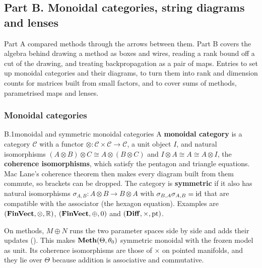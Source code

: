 \subsection*{Part B. Monoidal categories, string diagrams and lenses}
\label{app:bg-b}

Part A compared methods through the arrows between them. Part B covers the algebra behind drawing a method as boxes and
wires, reading a rank bound off a cut of the drawing, and treating backpropagation as a pair of maps. Entries 
to  set up monoidal categories and their diagrams,  to  turn them into rank and
dimension counts for matrices built from small factors, and  to  cover sums of methods,
parametrised maps and lenses.

\subsubsection*{Monoidal categories}

\begin{bgentry}{B.1}{monoidal and symmetric monoidal categories}
A \textbf{monoidal category} is a category $\mathcal C$ with a functor $\otimes:\mathcal C\times\mathcal C\to\mathcal C$,
a unit object $I$, and natural isomorphisms $(A\otimes B)\otimes C\cong A\otimes(B\otimes C)$ and
$I\otimes A\cong A\cong A\otimes I$, the \textbf{coherence isomorphisms}, which satisfy the pentagon and triangle
equations. Mac Lane's coherence theorem then makes every diagram built from them commute, so brackets can be dropped. The
category is \textbf{symmetric} if it also has natural isomorphisms $\sigma_{A,B}:A\otimes B\to B\otimes A$ with
$\sigma_{B,A}\sigma_{A,B}=\mathrm{id}$ that are compatible with the associator (the hexagon equation). Examples are
$(\mathbf{FinVect},\otimes,\mathbb{R})$, $(\mathbf{FinVect},\oplus,0)$ and $(\mathbf{Diff},\times,\mathrm{pt})$.
\end{bgentry}

On methods, $M\oplus N$ runs the two parameter spaces side by side and adds their updates (). This makes
$\mathbf{Meth}(\Theta,\theta_0)$ symmetric monoidal with the frozen model as unit. Its coherence isomorphisms are those of
$\times$ on pointed manifolds, and they lie over $\Theta$ because addition is associative and commutative.


